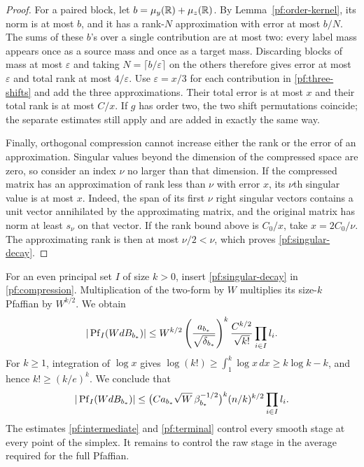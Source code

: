 \begin{proof}
For a paired block, let $b=\mu_y(\mathbb R)+\mu_z(\mathbb R)$.  By
Lemma~\ref{pf:order-kernel}, its norm is at most $b$, and it has a
rank-$N$ approximation with error at most $b/N$.  The sums of these
$b$'s over a single contribution are at most two: every label mass
appears once as a source mass and once as a target mass.  Discarding
blocks of mass at most $\varepsilon$ and taking
$N=\lceil b/\varepsilon\rceil$ on the others therefore gives error at
most $\varepsilon$ and total rank at most $4/\varepsilon$.  Use
$\varepsilon=x/3$ for each contribution in \eqref{pf:three-shifts}
and add the three approximations.  Their total error is at most $x$
and their total rank is at most $C/x$.  If $g$ has order two, the two
shift permutations coincide; the separate estimates still apply and
are added in exactly the same way.

Finally, orthogonal compression cannot increase either the rank or
the error of an approximation.  Singular values beyond the dimension
of the compressed space are zero, so consider an index $\nu$ no larger
than that dimension.  If the compressed matrix has an approximation
of rank less than $\nu$ with error $x$, its $\nu$th singular value is
at most $x$.  Indeed, the span of its first $\nu$
right singular vectors contains a unit vector annihilated by the
approximating matrix, and the original matrix has norm at least
$s_\nu$ on that vector.  If the rank bound above is $C_0/x$, take
$x=2C_0/\nu$.  The approximating rank is then at most $\nu/2<\nu$,
which proves \eqref{pf:singular-decay}.
\end{proof}

For an even principal set $I$ of size $k>0$, insert
\eqref{pf:singular-decay} in \eqref{pf:compression}.  Multiplication
of the two-form by $W$ multiplies its size-$k$ Pfaffian by $W^{k/2}$.
We obtain
\[
 |\operatorname{Pf}_I(WdB_{b_*})|
 \le W^{k/2}\left(\frac{a_{b_*}}{\sqrt{\delta_{b_*}}}\right)^k
       \frac{C^{k/2}}{\sqrt{k!}}\prod_{i\in I}l_i.
\]
For $k\ge1$, integration of $\log x$ gives
$\log(k!)\ge\int_1^k\log x\,dx\ge k\log k-k$, and hence
$k!\ge(k/e)^k$.  We conclude that
\begin{equation}
 |\operatorname{Pf}_I(WdB_{b_*})|
 \le\bigl(Ca_{b_*}\sqrt W\,\beta_{b_*}^{-1/2}\bigr)^k
          (n/k)^{k/2}\prod_{i\in I}l_i.
 \label{pf:terminal}
\end{equation}
The estimates \eqref{pf:intermediate} and \eqref{pf:terminal} control
every smooth stage at every point of the simplex.  It remains to
control the raw stage in the average required for the full Pfaffian.

